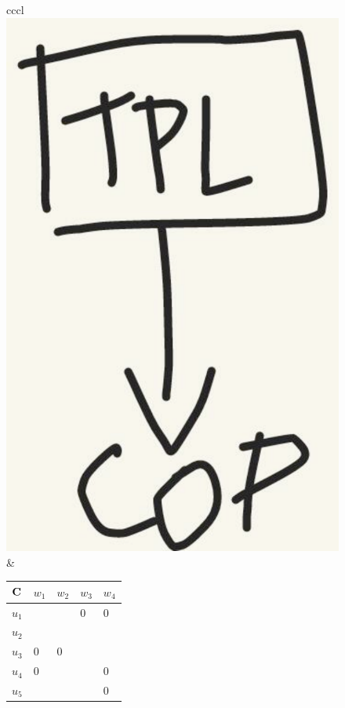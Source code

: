 \begin{figure}[t]
\begin{tabular}[h]{cccl}
    \includegraphics[scale=0.2]{../img/ex2_intervalgr.pdf} &
    \begin{tabular}[h]{l|llll}
      ${\bf C}$ &$w_1$ &$w_2$ &$w_3$ &$w_4$\\
      \hline
      $u_1$ &\un   &\un   &0     &0   \\
      $u_2$ &\un   &\un   &\un   &\un \\
      $u_3$ &0     &0     &\un   &\un \\
      $u_4$ &0     &\un   &\un   &0   \\
      $u_5$ &\un   &\un   &\un   &0   
    \end{tabular}
  \end{tabular}\\


\end{figure}
